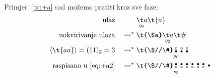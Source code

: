 \begin{primjer}\label{pr:+a3}
Primjer~\ref{pr:+a} sad možemo pratiti kroz sve faze:
\begin{align}
\text{ulaz}&&&\underset{\mathclap{q_0}}{\t a}\t{a}\\
\text{uokvirivanje ulaza}&&{}\leadsto^*{}&\t{\$a}\underset{\mathclap{q_2}}{\t a}\t\#\\
\kr{\t{aa}}=(11)_2=3&&\leadsto^*{}&
\renewcommand{\arraystretch}{0.1}
\t{\$//\#}\underset{\mathclap{p_0}}{\begin{array}{@{}c@{}}
    \text\textopenbullet\\
    \text\textbullet
    \end{array}}\begin{array}{@{}c@{}}
    \text\textopenbullet\\
    \text\textbullet
    \end{array}\begin{array}{@{}c@{}}
    \text\textopenbullet\\
    \text\textbullet
    \end{array}\\
    \text{raspisano u~\eqref{eq:+a2}}&&{}\leadsto^*{}&
\renewcommand{\arraystretch}{0.1}
 \t{\$//\#}\underset{\mathclap{s_5}}{\begin{array}{@{}c@{}}
    \text\textbullet\\
    \text\textopenbullet
    \end{array}}\begin{array}{@{}c@{}}
    \text\textbullet\\
    \text\textopenbullet
    \end{array}\begin{array}{@{}c@{}}
    \text\textbullet\\
    \text\textopenbullet
    \end{array}\begin{array}{@{}c@{}}
    \text\textbullet\\
    \text\textopenbullet
    \end{array}\begin{array}{@{}c@{}}
    \text\textbullet\\
    \text\textopenbullet
    \end{array}\begin{array}{@{}c@{}}
    \text\textbullet\\
    \text\textopenbullet
    \end{array}\begin{array}{@{}c@{}}
    \text\textbullet\\

\end{array}
\end{align}
\end{primjer}

